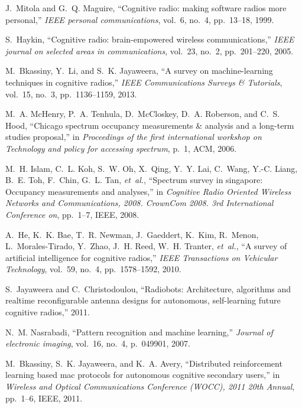 \documentclass[journal]{IEEEtran}
\begin{document}
%
%
\begin{thebibliography}{10}
\scriptsize
{}
J.~Mitola and G.~Q. Maguire, ``Cognitive radio: making software radios more
  personal,'' {\em IEEE personal communications}, vol.~6, no.~4, pp.~13--18,
  1999.

S.~Haykin, ``Cognitive radio: brain-empowered wireless communications,'' {\em
  IEEE journal on selected areas in communications}, vol.~23, no.~2,
  pp.~201--220, 2005.

M.~Bkassiny, Y.~Li, and S.~K. Jayaweera, ``A survey on machine-learning
  techniques in cognitive radios,'' {\em IEEE Communications Surveys \&
  Tutorials}, vol.~15, no.~3, pp.~1136--1159, 2013.

M.~A. McHenry, P.~A. Tenhula, D.~McCloskey, D.~A. Roberson, and C.~S. Hood,
  ``Chicago spectrum occupancy measurements \& analysis and a long-term studies
  proposal,'' in {\em Proceedings of the first international workshop on
  Technology and policy for accessing spectrum}, p.~1, ACM, 2006.

M.~H. Islam, C.~L. Koh, S.~W. Oh, X.~Qing, Y.~Y. Lai, C.~Wang, Y.-C. Liang,
  B.~E. Toh, F.~Chin, G.~L. Tan, {\em et~al.}, ``Spectrum survey in singapore:
  Occupancy measurements and analyses,'' in {\em Cognitive Radio Oriented
  Wireless Networks and Communications, 2008. CrownCom 2008. 3rd International
  Conference on}, pp.~1--7, IEEE, 2008.

A.~He, K.~K. Bae, T.~R. Newman, J.~Gaeddert, K.~Kim, R.~Menon,
  L.~Morales-Tirado, Y.~Zhao, J.~H. Reed, W.~H. Tranter, {\em et~al.}, ``A
  survey of artificial intelligence for cognitive radios,'' {\em IEEE
  Transactions on Vehicular Technology}, vol.~59, no.~4, pp.~1578--1592, 2010.

S.~Jayaweera and C.~Christodoulou, ``Radiobots: Architecture, algorithms and
  realtime reconfigurable antenna designs for autonomous, self-learning future
  cognitive radios,'' 2011.

N.~M. Nasrabadi, ``Pattern recognition and machine learning,'' {\em Journal of
  electronic imaging}, vol.~16, no.~4, p.~049901, 2007.

M.~Bkassiny, S.~K. Jayaweera, and K.~A. Avery, ``Distributed reinforcement
  learning based mac protocols for autonomous cognitive secondary users,'' in
  {\em Wireless and Optical Communications Conference (WOCC), 2011 20th
  Annual}, pp.~1--6, IEEE, 2011.


\end{thebibliography}
\end{document}
